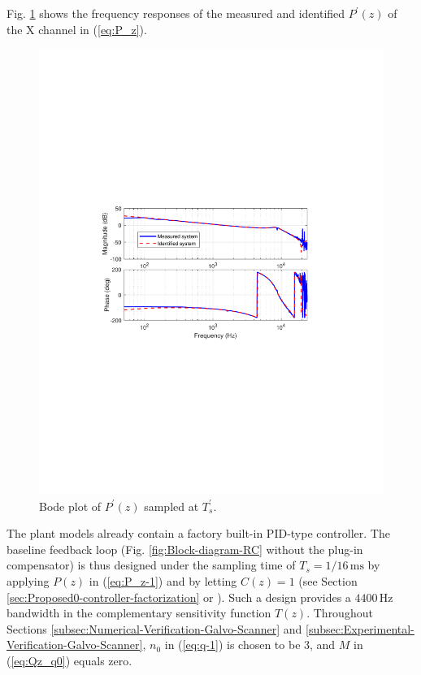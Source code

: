 \documentclass [11pt, proquest] {uwthesis}[2020/02/24]
\begin{document}
Fig. \ref{fig:Bode-plot-of} shows the frequency responses of the
measured and identified $P^{'}(z)$ of the X channel in (\ref{eq:P_z}).
\begin{figure}[!ht]
\begin{centering}
\includegraphics{Fractional-order-RC/bode_plant}
\par\end{centering}
\caption{\label{fig:Bode-plot-of}Bode plot of $P^{'}(z)$ sampled at $T_{s}^{'}$.}
\end{figure}

The plant models already contain a factory built-in PID-type controller.
The baseline feedback loop (Fig. \ref{fig:Block-diagram-RC} without
the plug-in compensator) is thus designed under the sampling time
of $T_{s}=1/16\,\text{ms}$ by applying $P(z)$ in (\ref{eq:P_z-1})
and by letting $C(z)=1$ (see Section \ref{sec:Proposed0-controller-factorization} or \cite{wang2017tutorial}). Such a design
provides a $4400\,\text{Hz}$ bandwidth in the complementary sensitivity
function $T(z)$. Throughout Sections \ref{subsec:Numerical-Verification-Galvo-Scanner}
and \ref{subsec:Experimental-Verification-Galvo-Scanner}, $n_{0}$ in (\ref{eq:q-1})
is chosen to be 3, and $M$ in (\ref{eq:Qz_q0}) equals zero.
\end{document}
